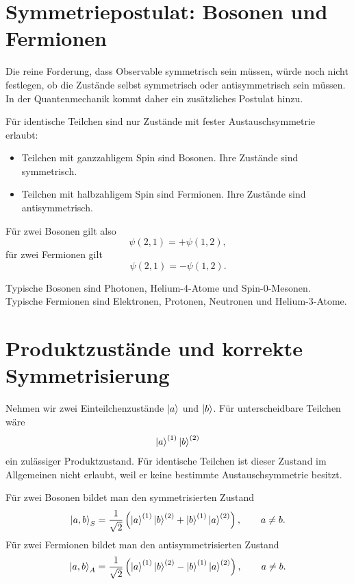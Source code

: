 \section{Symmetriepostulat: Bosonen und Fermionen}

Die reine Forderung, dass Observable symmetrisch sein müssen, würde noch nicht festlegen, ob die Zustände selbst symmetrisch oder antisymmetrisch sein müssen. In der Quantenmechanik kommt daher ein zusätzliches Postulat hinzu.

\begin{conceptbox}
Für identische Teilchen sind nur Zustände mit fester Austauschsymmetrie erlaubt:
\begin{itemize}
    \item Teilchen mit ganzzahligem Spin sind Bosonen. Ihre Zustände sind symmetrisch.
    \item Teilchen mit halbzahligem Spin sind Fermionen. Ihre Zustände sind antisymmetrisch.
\end{itemize}
\end{conceptbox}

Für zwei Bosonen gilt also
\[
    \psi(2,1)=+\psi(1,2),
\]
für zwei Fermionen gilt
\[
    \psi(2,1)=-\psi(1,2).
\]

\begin{examplebox}
Typische Bosonen sind Photonen, Helium-4-Atome und Spin-0-Mesonen. Typische Fermionen sind Elektronen, Protonen, Neutronen und Helium-3-Atome.
\end{examplebox}

\section{Produktzustände und korrekte Symmetrisierung}

Nehmen wir zwei Einteilchenzustände \(\left|a\right\rangle\) und \(\left|b\right\rangle\). Für unterscheidbare Teilchen wäre
\[
    \left|a\right\rangle^{(1)}\left|b\right\rangle^{(2)}
\]
ein zulässiger Produktzustand. Für identische Teilchen ist dieser Zustand im Allgemeinen nicht erlaubt, weil er keine bestimmte Austauschsymmetrie besitzt.

Für zwei Bosonen bildet man den symmetrisierten Zustand
\[
    \left|a,b\right\rangle_S
    =\frac{1}{\sqrt{2}}
    \left(\left|a\right\rangle^{(1)}\left|b\right\rangle^{(2)}+
    \left|b\right\rangle^{(1)}\left|a\right\rangle^{(2)}\right),
    \qquad a\neq b.
\]
Für zwei Fermionen bildet man den antisymmetrisierten Zustand
\[
    \left|a,b\right\rangle_A
    =\frac{1}{\sqrt{2}}
    \left(\left|a\right\rangle^{(1)}\left|b\right\rangle^{(2)}-
    \left|b\right\rangle^{(1)}\left|a\right\rangle^{(2)}\right),
    \qquad a\neq b.
\]

